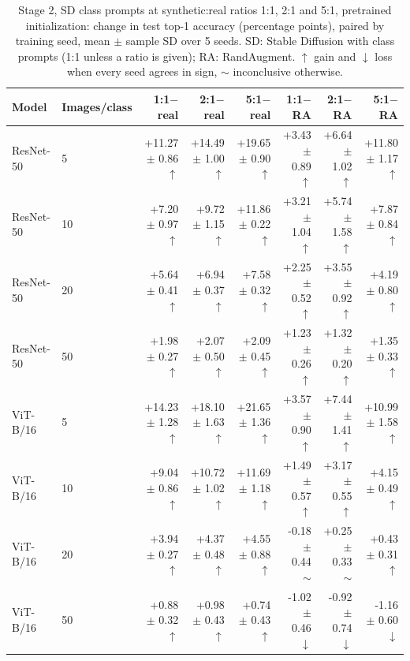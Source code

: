 \begin{table}[H]
\centering
\small
\setlength{\tabcolsep}{4pt}
\caption{Stage 2, SD class prompts at synthetic:real ratios 1:1, 2:1 and 5:1, pretrained initialization: change in test top-1 accuracy (percentage points), paired by training seed, mean $\pm$ sample SD over 5 seeds. SD: Stable Diffusion with class prompts (1:1 unless a ratio is given); RA: RandAugment. $\uparrow$ gain and $\downarrow$ loss when every seed agrees in sign, $\sim$ inconclusive otherwise.}
\label{tab:stage2-ratio-pretrained-test}
\begin{tabular}{llrrrrrr}
\toprule
Model & Images/class & 1:1$-$real & 2:1$-$real & 5:1$-$real & 1:1$-$RA & 2:1$-$RA & 5:1$-$RA \\
\midrule
ResNet-50 & 5 & +11.27 $\pm$ 0.86 $\uparrow$ & +14.49 $\pm$ 1.00 $\uparrow$ & +19.65 $\pm$ 0.90 $\uparrow$ & +3.43 $\pm$ 0.89 $\uparrow$ & +6.64 $\pm$ 1.02 $\uparrow$ & +11.80 $\pm$ 1.17 $\uparrow$ \\
ResNet-50 & 10 & +7.20 $\pm$ 0.97 $\uparrow$ & +9.72 $\pm$ 1.15 $\uparrow$ & +11.86 $\pm$ 0.22 $\uparrow$ & +3.21 $\pm$ 1.04 $\uparrow$ & +5.74 $\pm$ 1.58 $\uparrow$ & +7.87 $\pm$ 0.84 $\uparrow$ \\
ResNet-50 & 20 & +5.64 $\pm$ 0.41 $\uparrow$ & +6.94 $\pm$ 0.37 $\uparrow$ & +7.58 $\pm$ 0.32 $\uparrow$ & +2.25 $\pm$ 0.52 $\uparrow$ & +3.55 $\pm$ 0.92 $\uparrow$ & +4.19 $\pm$ 0.80 $\uparrow$ \\
ResNet-50 & 50 & +1.98 $\pm$ 0.27 $\uparrow$ & +2.07 $\pm$ 0.50 $\uparrow$ & +2.09 $\pm$ 0.45 $\uparrow$ & +1.23 $\pm$ 0.26 $\uparrow$ & +1.32 $\pm$ 0.20 $\uparrow$ & +1.35 $\pm$ 0.33 $\uparrow$ \\
\midrule
ViT-B/16 & 5 & +14.23 $\pm$ 1.28 $\uparrow$ & +18.10 $\pm$ 1.63 $\uparrow$ & +21.65 $\pm$ 1.36 $\uparrow$ & +3.57 $\pm$ 0.90 $\uparrow$ & +7.44 $\pm$ 1.41 $\uparrow$ & +10.99 $\pm$ 1.58 $\uparrow$ \\
ViT-B/16 & 10 & +9.04 $\pm$ 0.86 $\uparrow$ & +10.72 $\pm$ 1.02 $\uparrow$ & +11.69 $\pm$ 1.18 $\uparrow$ & +1.49 $\pm$ 0.57 $\uparrow$ & +3.17 $\pm$ 0.55 $\uparrow$ & +4.15 $\pm$ 0.49 $\uparrow$ \\
ViT-B/16 & 20 & +3.94 $\pm$ 0.27 $\uparrow$ & +4.37 $\pm$ 0.48 $\uparrow$ & +4.55 $\pm$ 0.88 $\uparrow$ & -0.18 $\pm$ 0.44 $\sim$ & +0.25 $\pm$ 0.33 $\sim$ & +0.43 $\pm$ 0.31 $\uparrow$ \\
ViT-B/16 & 50 & +0.88 $\pm$ 0.32 $\uparrow$ & +0.98 $\pm$ 0.43 $\uparrow$ & +0.74 $\pm$ 0.43 $\uparrow$ & -1.02 $\pm$ 0.46 $\downarrow$ & -0.92 $\pm$ 0.74 $\downarrow$ & -1.16 $\pm$ 0.60 $\downarrow$ \\
\bottomrule
\end{tabular}
\end{table}

